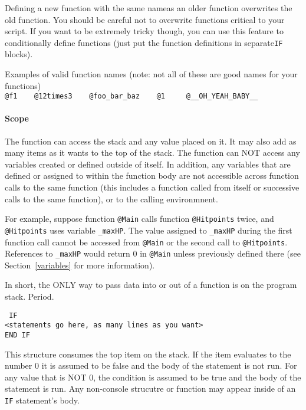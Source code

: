 Defining a new function with the same nameas an older function overwrites the
old function. You should be careful not to overwrite functions critical to
your script. If you want to be extremely tricky though, you can use this
feature to conditionally define functions (just put the function definitions
in separate\texttt{IF} blocks).

\noindent%
Examples of valid function names (note: not all of these are good names for
your functions)\\
\texttt{@f1 \ \ \  @12times3 \ \ \  @foo\_bar\_baz \ \ \ @1 \ \ \ %
@\_\_OH\_YEAH\_BABY\_\_}

\paragraph*{Scope\\}
\hspace*{\parindent}The function can access the stack and any value placed on
it. It may also
add as many items as it wants to the top of the stack. The function
can NOT access any variables created or defined outside of itself. In addition,
any variables that are defined or assigned to within the function body are not
accessible across function calls to the same function
(this includes a function called from itself or successive calls to the
same function), or to the calling environmnent.

For example, suppose function \texttt{@Main} calls function \texttt{@Hitpoints}
twice, and \texttt{@Hitpoints} uses variable \texttt{\_maxHP}. The value
assigned to \texttt{\_maxHP} during the first function call cannot be accessed
from \texttt{@Main} or the second call to \texttt{@Hitpoints}.
References to \texttt{\_maxHP} would return 0 in \texttt{@Main} unless
previously defined there (see Section~\ref{variables} for more information).

In short, the ONLY way to pass data into or out of a function is on the program
stack. Period.

\breakline

\noindent\texttt{%
IF\\
<statements go here, as many lines as you want>\\
END IF}

This structure consumes the top item on the stack. If the item evaluates to the
number 0 it is assumed to be false and the body of the statement is not run.
For any value that is NOT 0, the condition is assumed to be true and the body
of the statement is run. Any non-console strucutre or function may appear
inside of an \texttt{IF} statement's body.

